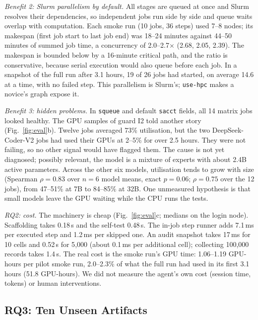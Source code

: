 \documentclass[10pt,conference]{IEEEtran}
\newcommand{\tool}{\texttt{use-hpc}}
\newcommand{\code}[1]{\texttt{#1}}
\begin{document}
\emph{Benefit 2: Slurm parallelism by default.} All stages are queued at once and Slurm resolves their dependencies, so independent jobs run side by side and queue waits overlap with computation. Each smoke run (10 jobs, 36 steps) used 7--8 nodes; its makespan (first job start to last job end) was 18--24 minutes against 44--50 minutes of summed job time, a concurrency of 2.0--2.7$\times$ (2.68, 2.05, 2.39). The makespan is bounded below by a 16-minute critical path, and the ratio is conservative, because serial execution would also queue before each job. In a snapshot of the full run after 3.1 hours, 19 of 26 jobs had started, on average 14.6 at a time, with no failed step. This parallelism is Slurm's; \tool{} makes a novice's graph expose it.

\emph{Benefit 3: hidden problems.} In \code{squeue} and default \code{sacct} fields, all 14 matrix jobs looked healthy. The GPU samples of guard I2 told another story (Fig.~\ref{fig:eval}b). Twelve jobs averaged 73\% utilisation, but the two DeepSeek-Coder-V2 jobs had used their GPUs at 2--5\% for over 2.5 hours. They were not failing, so no other signal would have flagged them. The cause is not yet diagnosed; possibly relevant, the model is a mixture of experts with about 2.4B active parameters. Across the other six models, utilisation tends to grow with size (Spearman $\rho = 0.83$ over $n = 6$ model means, exact $p = 0.06$; $\rho = 0.75$ over the 12 jobs), from 47--51\% at 7B to 84--85\% at 32B. One unmeasured hypothesis is that small models leave the GPU waiting while the CPU runs the tests.

\emph{RQ2: cost.} The machinery is cheap (Fig.~\ref{fig:eval}c; medians on the login node). Scaffolding takes 0.18\,s and the self-test 0.48\,s. The in-job step runner adds 7.1\,ms per executed step and 1.2\,ms per skipped one. An audit snapshot takes 17\,ms for 10 cells and 0.52\,s for 5{,}000 (about 0.1\,ms per additional cell); collecting 100{,}000 records takes 1.4\,s. The real cost is the smoke run's GPU time: 1.06--1.19 GPU-hours per pilot smoke run, 2.0--2.3\% of what the full run had used in its first 3.1 hours (51.8 GPU-hours). We did not measure the agent's own cost (session time, tokens) or human interventions.

\subsection{RQ3: Ten Unseen Artifacts}\label{sec:study}
\end{document}
